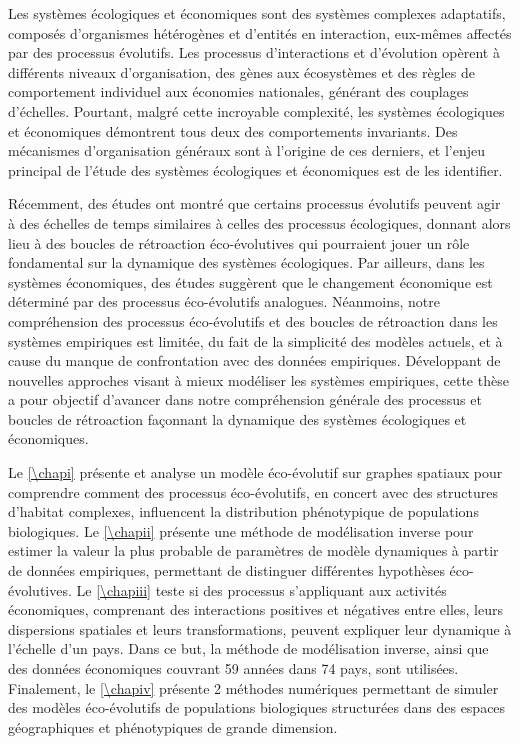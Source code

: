 \label{sec:summary-fr}
\small{
Les systèmes écologiques et économiques sont des systèmes complexes adaptatifs, composés d'organismes hétérogènes et d'entités en interaction, eux-mêmes affectés par des processus évolutifs. Les processus d'interactions et d'évolution opèrent à différents niveaux d'organisation, des gènes aux écosystèmes et des règles de comportement individuel aux économies nationales, générant des couplages d'échelles. Pourtant, malgré cette incroyable complexité, les systèmes écologiques et économiques démontrent tous deux des comportements invariants. Des mécanismes d'organisation généraux sont à l'origine de ces derniers, et l'enjeu principal de l'étude des systèmes écologiques et économiques est de les identifier.
 
Récemment, des études ont montré que certains processus évolutifs peuvent agir à des échelles de temps similaires à celles des processus écologiques, donnant alors lieu à des boucles de rétroaction éco-évolutives qui pourraient jouer un rôle fondamental sur la dynamique des systèmes écologiques. Par ailleurs, dans les systèmes économiques, des études suggèrent que le changement économique est déterminé par des processus éco-évolutifs analogues. Néanmoins, notre compréhension des processus éco-évolutifs et des boucles de rétroaction dans les systèmes empiriques est limitée, du fait de la simplicité des modèles actuels, et à cause du manque de confrontation avec des données empiriques.  Développant de nouvelles approches visant à mieux modéliser les systèmes empiriques, cette thèse a pour objectif d'avancer dans notre compréhension générale des processus et boucles de rétroaction façonnant la dynamique des systèmes écologiques et économiques.
 
Le \cref{\chapi} présente et analyse un modèle éco-évolutif sur graphes spatiaux pour comprendre comment des processus éco-évolutifs, en concert avec des structures d'habitat complexes, influencent la distribution phénotypique de populations biologiques. Le \cref{\chapii} présente une méthode de modélisation inverse pour estimer la valeur la plus probable de paramètres de modèle dynamiques à partir de données empiriques, permettant de distinguer différentes hypothèses éco-évolutives. Le \cref{\chapiii} teste si des processus s'appliquant aux activités économiques, comprenant des interactions positives et négatives entre elles, leurs dispersions spatiales et leurs transformations, peuvent expliquer leur dynamique à l'échelle d'un pays. Dans ce but, la méthode de modélisation inverse, ainsi que des données économiques couvrant 59 années dans 74 pays, sont utilisées. Finalement, le \cref{\chapiv} présente 2 méthodes numériques permettant de simuler des modèles éco-évolutifs de populations biologiques structurées dans des espaces géographiques et phénotypiques de grande dimension.
 
}
